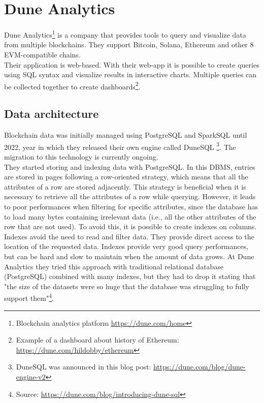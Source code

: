 \section{Dune Analytics}

Dune Analytics\footnote{Blockchain analytics platform \url{https://dune.com/home}} is a company that provides tools to query and visualize data from multiple blockchains. They support Bitcoin, Solana, Ethereum and other 8 EVM-compatible chains.\\

Their application is web-based. With their web-app it is possible to create queries using SQL syntax and visualize results in interactive charts. Multiple queries can be collected together to create dashboards\footnote{Example of a dashboard about history of Ethereum: \url{https://dune.com/hildobby/ethereum}}.  

\subsection{Data architecture}

Blockchain data was initially managed using PostgreSQL and SparkSQL until 2022, year in which they released their own engine called DuneSQL \footnote{DuneSQL was announced in this blog post: \url{https://dune.com/blog/dune-engine-v2}}. The migration to this technology is currently ongoing. \\

They started storing and indexing data with PostgreSQL.
In this DBMS, entries are stored in pages following a row-oriented strategy, which means that all the attributes of a row are stored adjacently. 
This strategy is beneficial when it is necessary to retrieve all the attributes of a row while querying. 
However, it leads to poor performances when filtering for specific attributes, since the database has to load many bytes containing irrelevant data (i.e., all the other attributes of the row that are not used). 
To avoid this, it is possible to create indexes on columns. 
Indexes avoid the need to read and filter data. They provide direct access to the location of the requested data.
Indexes provide very good query performances, but can be hard and slow to maintain when the amount of data grows.
At Dune Analytics they tried this approach with traditional relational database (PostgreSQL) combined with many indexes, but they had to drop it stating that "the size of the datasets were so huge that the database was struggling to fully support them"\footnote{Source: \url{https://dune.com/blog/introducing-dune-sql}}. \\

